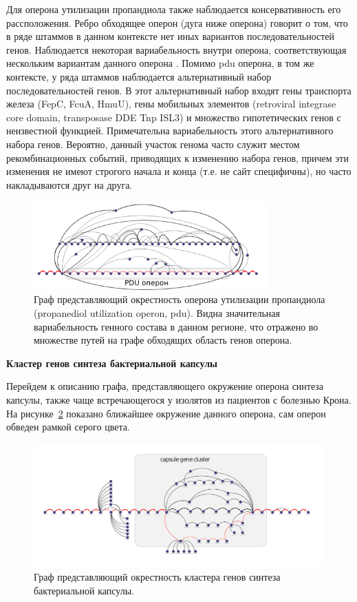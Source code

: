Для оперона утилизации пропандиола также наблюдается консервативность его рассположения. Ребро обходящее оперон (дуга ниже оперона) говорит о том, что в ряде штаммов в данном контексте нет иных вариантов последовательностей генов. Наблюдается некоторая вариабельность внутри оперона, соответствующая нескольким вариантам данного оперона \cite{rakitina2017genome}. Помимо pdu оперона, в том же контексте, у ряда штаммов наблюдается альтернативный набор последовательностей генов. В этот альтернативный набор входят гены транспорта железа (FepC, FcuA, HmuU), гены мобильных элементов (retroviral integrase core domain, transposase DDE Tnp ISL3) и множество гипотетических генов с неизвестной функцией. Примечательна вариабельность этого альтернативного набора генов. Вероятно, данный участок генома часто служит местом рекомбинационных событий, приводящих к изменению набора генов, причем эти изменения не имеют строгого начала и конца (т.е. не сайт специфичны), но часто накладываются друг на друга. 

\begin{figure}[!ht] 
  \center
    \includegraphics[width=0.8\textwidth]{Dissertation/images/subgraphs/pdu_laconic.png}
  \caption{Граф представляющий окрестность оперона утилизации пропандиола (propanediol utilization operon, pdu). Видна значительная вариабельность генного состава в данном регионе, что отражено во множестве путей на графе обходящих область генов оперона.}
  \label{img:sub_pdu} 
\end{figure}

\textbf{Кластер генов синтеза бактериальной капсулы}

Перейдем к описанию графа, представляющего окружение оперона синтеза капсулы, также чаще встречающегося у изолятов из пациентов с болезнью Крона. На рисунке~\ref{img:capsule_sub_small} показано ближайшее окружение данного оперона, сам оперон обведен рамкой серого цвета. 

\begin{figure}[!ht] 
  \center
    \includegraphics[width=\textwidth]{Dissertation/images/subgraphs/capsular_subgraph.png}
  \caption{Граф представляющий окрестность кластера генов синтеза бактериальной капсулы. }
  \label{img:capsule_sub_small} 
\end{figure}

